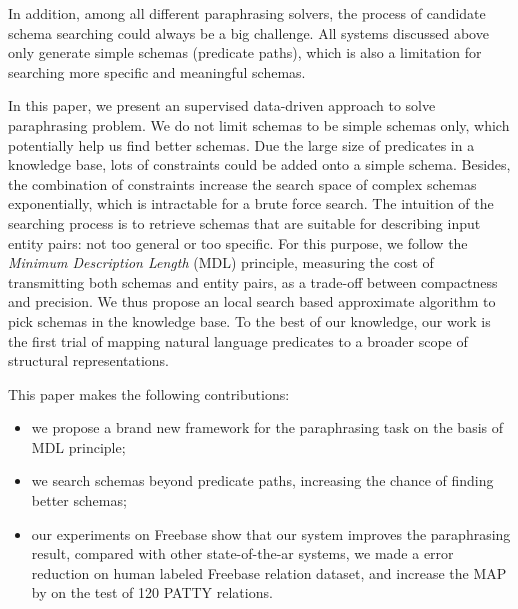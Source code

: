 In addition, among all different paraphrasing solvers, the process of candidate schema 
searching could always be a big challenge. All systems discussed above only generate
simple schemas (predicate paths), which is also a limitation for searching more
specific and meaningful schemas.

In this paper, we present an supervised data-driven approach to solve paraphrasing problem.
We do not limit schemas to be simple schemas only, which potentially help us find better
schemas. Due the large size of predicates in a knowledge base, lots of constraints could be 
added onto a simple schema. Besides, the combination of constraints increase the search space
of complex schemas exponentially, which is intractable for a brute force search.
The intuition of the searching process is to retrieve schemas that are suitable for describing
input entity pairs: not too general or too specific.
For this purpose, we follow the \textit{Minimum Description Length} (MDL) principle, measuring
the cost of transmitting both schemas and entity pairs, as a trade-off between compactness and
precision. We thus propose an local search based approximate algorithm to pick schemas in the 
knowledge base.
To the best of our knowledge, our work is the first trial of mapping natural language predicates 
to a broader scope of structural representations.

This paper makes the following contributions:
\begin{itemize}
	\item we propose a brand new framework for the paraphrasing task on the basis of MDL principle;
	\item we search schemas beyond predicate paths, increasing the chance of finding better schemas;
	\item our experiments on Freebase show that our system improves the paraphrasing result,
	      compared with other state-of-the-ar systems, we made a  error reduction on
		  human labeled Freebase relation dataset, and increase the MAP by  on the test
		  of 120 PATTY relations.
\end{itemize}



